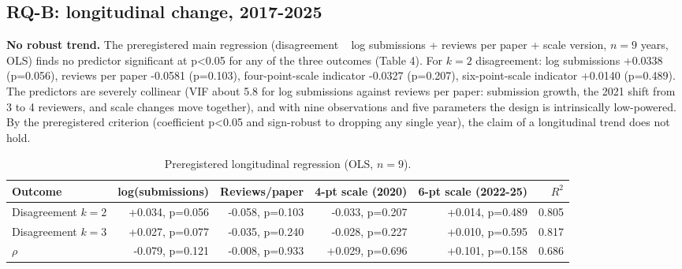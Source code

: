 \documentclass[10pt]{article}
\begin{document}
\subsection{RQ-B: longitudinal change, 2017-2025}

\textbf{No robust trend.} The preregistered main regression (disagreement ~ log submissions + reviews per paper + scale version, $n=9$ years, OLS) finds no predictor significant at p<0.05 for any of the three outcomes (Table 4). For $k=2$ disagreement: log submissions +0.0338 (p=0.056), reviews per paper -0.0581 (p=0.103), four-point-scale indicator -0.0327 (p=0.207), six-point-scale indicator +0.0140 (p=0.489). The predictors are severely collinear (VIF about 5.8 for log submissions against reviews per paper: submission growth, the 2021 shift from 3 to 4 reviewers, and scale changes move together), and with nine observations and five parameters the design is intrinsically low-powered. By the preregistered criterion (coefficient p<0.05 and sign-robust to dropping any single year), the claim of a longitudinal trend does not hold.

\begin{table}[t]
\centering
\caption{Preregistered longitudinal regression (OLS, $n=9$).}\label{tab:t4}
\begin{tabular}{lrrrrr}\toprule
Outcome & log(submissions) & Reviews/paper & 4-pt scale (2020) & 6-pt scale (2022-25) & $R^2$ \\
\midrule
Disagreement $k=2$ & +0.034, p=0.056 & -0.058, p=0.103 & -0.033, p=0.207 & +0.014, p=0.489 & 0.805 \\
Disagreement $k=3$ & +0.027, p=0.077 & -0.035, p=0.240 & -0.028, p=0.227 & +0.010, p=0.595 & 0.817 \\
$\rho$ & -0.079, p=0.121 & -0.008, p=0.933 & +0.029, p=0.696 & +0.101, p=0.158 & 0.686 \\
\bottomrule
\end{tabular}
\end{table}
\end{document}

